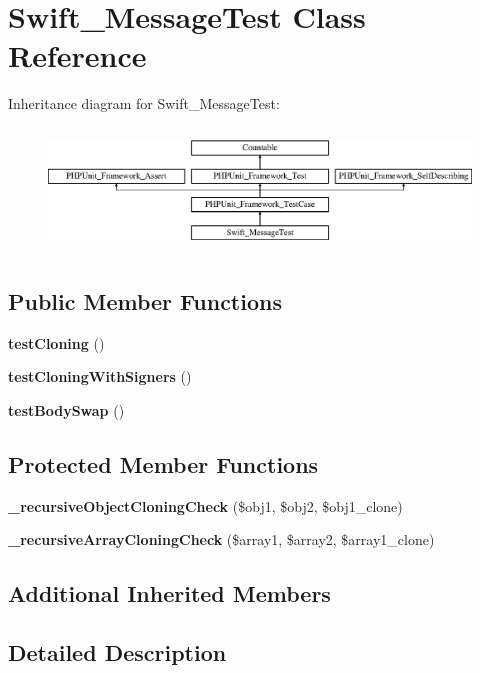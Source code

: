 \section{Swift\+\_\+\+Message\+Test Class Reference}
\label{class_swift___message_test}
Inheritance diagram for Swift\+\_\+\+Message\+Test\+:\begin{figure}[H]
\begin{center}
\leavevmode
\includegraphics[height=3.303835cm]{class_swift___message_test}
\end{center}
\end{figure}
\subsection*{Public Member Functions}
\begin{DoxyCompactItemize}
\item 
{\bf test\+Cloning} ()
\item 
{\bf test\+Cloning\+With\+Signers} ()
\item 
{\bf test\+Body\+Swap} ()
\end{DoxyCompactItemize}
\subsection*{Protected Member Functions}
\begin{DoxyCompactItemize}
\item 
{\bf \+\_\+recursive\+Object\+Cloning\+Check} (\$obj1, \$obj2, \$obj1\+\_\+clone)
\item 
{\bf \+\_\+recursive\+Array\+Cloning\+Check} (\$array1, \$array2, \$array1\+\_\+clone)
\end{DoxyCompactItemize}
\subsection*{Additional Inherited Members}


\subsection{Detailed Description}


